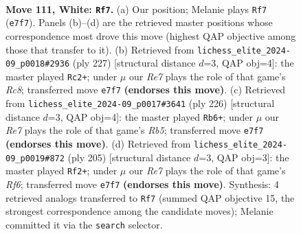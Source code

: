 \documentclass[11pt]{article}
\begin{document}
\clearpage

\begin{figure}[p]\centering
\begin{subfigure}{0.46\textwidth}\centering
\resizebox{\linewidth}{!}{%
\newchessgame
\chessboard[
  setfen={8/4R3/2k5/6K1/6P1/1N6/8/7r w - - 5 111},
  showmover=false,
  pgfstyle=straightmove, color=movearrow, markmove={e7-f7}
]}
\caption{}
\end{subfigure}\hfill
\begin{subfigure}{0.46\textwidth}\centering
\resizebox{\linewidth}{!}{%
\newchessgame
\chessboard[
  setfen={8/8/6R1/8/5p2/5k2/7K/2r5 b - - 27 114},
  showmover=false,
  pgfstyle=straightmove, color=movearrow, markmove={c1-c2}
]}
\caption{}
\end{subfigure}
\\[4pt]
\begin{subfigure}{0.46\textwidth}\centering
\resizebox{\linewidth}{!}{%
\newchessgame
\chessboard[
  setfen={8/7K/4k2P/1R6/8/8/8/6r1 w - - 35 114},
  showmover=false,
  pgfstyle=straightmove, color=movearrow, markmove={b5-b6}
]}
\caption{}
\end{subfigure}\hfill
\begin{subfigure}{0.46\textwidth}\centering
\resizebox{\linewidth}{!}{%
\newchessgame
\chessboard[
  setfen={6R1/8/8/7p/7k/5r2/7K/8 b - - 1 103},
  showmover=false,
  pgfstyle=straightmove, color=movearrow, markmove={f3-f2}
]}
\caption{}
\end{subfigure}
\caption{\textbf{Move 111, White: \texttt{Rf7}.} (a) Our position; Melanie plays \texttt{Rf7} (\texttt{e7f7}). Panels (b)--(d) are the retrieved master positions whose correspondence most drove this move (highest QAP objective among those that transfer to it). (b) Retrieved from \texttt{lichess\_elite\_2024-09\_p0018\#2936} (ply 227) [structural distance $d$=3, QAP obj=4]: the master played \texttt{Rc2+}; under $\mu$ our \emph{Re7} plays the role of that game's \emph{Rc8}; transferred move \texttt{e7f7} \textbf{(endorses this move)}. (c) Retrieved from \texttt{lichess\_elite\_2024-09\_p0017\#3641} (ply 226) [structural distance $d$=3, QAP obj=4]: the master played \texttt{Rb6+}; under $\mu$ our \emph{Re7} plays the role of that game's \emph{Rb5}; transferred move \texttt{e7f7} \textbf{(endorses this move)}. (d) Retrieved from \texttt{lichess\_elite\_2024-09\_p0019\#872} (ply 205) [structural distance $d$=3, QAP obj=3]: the master played \texttt{Rf2+}; under $\mu$ our \emph{Re7} plays the role of that game's \emph{Rf6}; transferred move \texttt{e7f7} \textbf{(endorses this move)}. Synthesis: 4 retrieved analogs transferred to \texttt{Rf7} (summed QAP objective 15, the strongest correspondence among the candidate moves); Melanie committed it via the \texttt{search} selector.}
\label{fig:thought-m220}
\end{figure}
\end{document}
